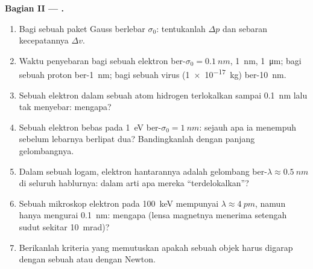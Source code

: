 \begin{problem}
\textbf{Bagian II --- .}
\begin{enumerate}[resume]
  \item Bagi sebuah paket Gauss berlebar $\sigma_0$: tentukanlah $\Delta p$ dan
        sebaran kecepatannya $\Delta v$.
  \item Waktu penyebaran bagi sebuah elektron ber-$\sigma_0 = \qty{0.1}{nm}$,
        \qty{1}{nm}, \qty{1}{\micro m}; bagi sebuah proton ber-\qty{1}{nm}; bagi sebuah
        virus (\qty{1e-17}{kg}) ber-\qty{10}{nm}.
  \item Sebuah elektron dalam sebuah atom hidrogen terlokalkan sampai \qty{0.1}{nm}
        lalu tak menyebar: mengapa?
  \item Sebuah elektron bebas pada \qty{1}{eV} ber-$\sigma_0 = \qty{1}{nm}$: sejauh apa
        ia menempuh sebelum lebarnya berlipat dua? Bandingkanlah dengan
        panjang gelombangnya.
  \item Dalam sebuah logam, elektron hantarannya adalah gelombang ber-$\lambda \approx
        \qty{0.5}{nm}$ di seluruh hablurnya: dalam arti apa mereka
        ``terdelokalkan''?
  \item Sebuah mikroskop elektron pada \qty{100}{keV} mempunyai $\lambda \approx
        \qty{4}{pm}$, namun hanya mengurai \qty{0.1}{nm}: mengapa (lensa magnetnya
        menerima setengah sudut sekitar \qty{10}{mrad})?
  \item Berikanlah kriteria yang memutuskan apakah sebuah objek harus
        digarap dengan sebuah  atau dengan Newton.
\end{enumerate}


\end{problem}
